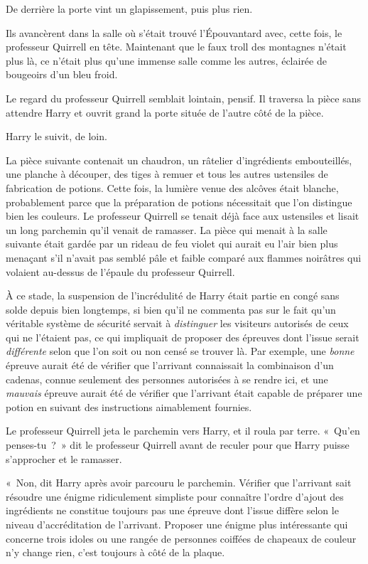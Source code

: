 De derrière la porte vint un glapissement, puis plus rien.

Ils avancèrent dans la salle où s'était trouvé l'Épouvantard avec, cette fois, le professeur Quirrell en tête.
Maintenant que le faux troll des montagnes n'était plus là, ce n'était plus qu'une immense salle comme les autres, éclairée de bougeoirs d'un bleu froid.

Le regard du professeur Quirrell semblait lointain, pensif.
Il traversa la pièce sans attendre Harry et ouvrit grand la porte située de l'autre côté de la pièce.

Harry le suivit, de loin.

\later

La pièce suivante contenait un chaudron, un râtelier d'ingrédients embouteillés, une planche à découper, des tiges à remuer et tous les autres ustensiles de fabrication de potions.
Cette fois, la lumière venue des alcôves était blanche, probablement parce que la préparation de potions nécessitait que l'on distingue bien les couleurs.
Le professeur Quirrell se tenait déjà face aux ustensiles et lisait un long parchemin qu'il venait de ramasser.
La pièce qui menait à la salle suivante était gardée par un rideau de feu violet qui aurait eu l'air bien plus menaçant s'il n'avait pas semblé pâle et faible comparé aux flammes noirâtres qui volaient au-dessus de l'épaule du professeur Quirrell.

À ce stade, la suspension de l'incrédulité de Harry était partie en congé sans solde depuis bien longtemps, si bien qu'il ne commenta pas sur le fait qu'un véritable système de sécurité servait à \emph{distinguer} les visiteurs autorisés de ceux qui ne l'étaient pas, ce qui impliquait de proposer des épreuves dont l'issue serait \emph{différente} selon que l'on soit ou non censé se trouver là.
Par exemple, une \emph{bonne} épreuve aurait été de vérifier que l'arrivant connaissait la combinaison d'un cadenas, connue seulement des personnes autorisées à se rendre ici, et une \emph{mauvais} épreuve aurait été de vérifier que l'arrivant était capable de préparer une potion en suivant des instructions aimablement fournies.

Le professeur Quirrell jeta le parchemin vers Harry, et il roula par terre.
«~Qu'en penses-tu~?~»
dit le professeur Quirrell avant de reculer pour que Harry puisse s'approcher et le ramasser.

«~Non, dit Harry après avoir parcouru le parchemin.
Vérifier que l'arrivant sait résoudre une énigme ridiculement simpliste pour connaître l'ordre d'ajout des ingrédients ne constitue toujours pas une épreuve dont l'issue diffère selon le niveau d'accréditation de l'arrivant.
Proposer une énigme plus intéressante qui concerne trois idoles ou une rangée de personnes coiffées de chapeaux de couleur n'y change rien, c'est toujours à côté de la plaque.

